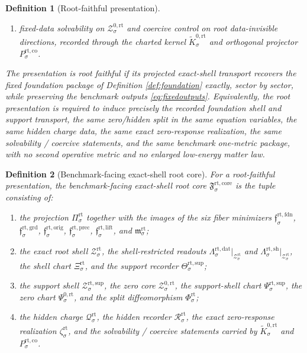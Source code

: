 \documentclass[11pt]{article}
\newcommand{\ForSpace}[1]{\mathcal I_{#1}^{\mathrm{for}}}
\newcommand{\RootProj}[1]{\Pi_{#1}^{\mathrm{rt}}}
\newcommand{\RootFoundMin}[1]{\mathfrak f_{#1}^{\mathrm{rt,fdn}}}
\newcommand{\RootGroundMin}[1]{\mathfrak f_{#1}^{\mathrm{rt,grd}}}
\newcommand{\RootOrigMin}[1]{\mathfrak f_{#1}^{\mathrm{rt,orig}}}
\newcommand{\RootPrecMin}[1]{\mathfrak f_{#1}^{\mathrm{rt,prec}}}
\newcommand{\RootLiftMin}[1]{\mathfrak f_{#1}^{\mathrm{rt,lift}}}
\newcommand{\RootSubMin}[1]{\mathfrak m_{#1}^{\mathrm{rt}}}
\newcommand{\RootData}[1]{\Lambda_{#1}^{\mathrm{rt,dat}}}
\newcommand{\RootShellMap}[1]{\Lambda_{#1}^{\mathrm{rt,sh}}}
\newcommand{\RootShellSet}[1]{\mathcal Z_{#1}^{\mathrm{rt}}}
\newcommand{\RootChart}[1]{\Xi_{#1}^{\mathrm{rt}}}
\newcommand{\RootSupport}[1]{\Theta_{#1}^{\mathrm{rt,sup}}}
\newcommand{\RootSupportShell}[1]{\mathcal Z_{#1}^{\mathrm{rt,sup}}}
\newcommand{\RootZeroCore}[1]{\mathcal Z_{#1}^{0,\mathrm{rt}}}
\newcommand{\RootEqChart}[1]{\Psi_{#1}^{\mathrm{rt,sup}}}
\newcommand{\RootZeroChart}[1]{\Psi_{#1}^{0,\mathrm{rt}}}
\newcommand{\RootSplit}[1]{\Phi_{#1}^{\mathrm{rt}}}
\newcommand{\RootCharge}[1]{\mathcal Q_{#1}^{\mathrm{rt}}}
\newcommand{\RootResidual}[1]{\mathcal R_{#1}^{\mathrm{rt}}}
\newcommand{\RootEmbed}[1]{\zeta_{#1}^{\mathrm{rt}}}
\newcommand{\RootKernelCh}[1]{\widetilde K_{#1}^{0,\mathrm{rt}}}
\newcommand{\RootStateComp}[1]{P_{#1}^{\mathrm{rt,co}}}
\newcommand{\SeedHidden}[1]{\mathcal H_{#1}^{\mathrm{sup}}}
\newcommand{\EqnTarget}[1]{Q_{#1}^{\mathrm{eqn}}}
\newcommand{\RootCore}[1]{\mathfrak F_{#1}^{\mathrm{rt,core}}}
\newtheorem{definition}{Definition}
\begin{document}
\begin{definition}[Root-faithful presentation]
\begin{enumerate}
    \[
    \RootCharge{\sigma}:\SeedHidden{\sigma}\to\EqnTarget{\sigma},
    \]
    the hidden recorder
    \[
    \RootResidual{\sigma}\bigl(\RootSplit{\sigma}(z,\eta)\bigr)
    \equiv
    \RootCharge{\sigma}(\eta),
    \]
    and a smooth observer-compatible exact root zero-response realization
    \[
    \RootEmbed{\sigma}:\ForSpace{\sigma}\hookrightarrow\RootZeroCore{\sigma};
    \]
    \item fixed-data solvability on \(\RootZeroCore{\sigma}\) and coercive control on root data-invisible directions, recorded through the charted kernel \(\RootKernelCh{\sigma}\) and orthogonal projector \(\RootStateComp{\sigma}\).
\end{enumerate}
The presentation is \emph{root faithful} if its projected exact-shell transport recovers the fixed foundation package of Definition \ref{def:foundation} exactly, sector by sector, while preserving the benchmark outputs \eqref{eq:fixedoutputs}. Equivalently, the root presentation is required to induce precisely the recorded foundation shell and support transport, the same zero/hidden split in the same equation variables, the same hidden charge data, the same exact zero-response realization, the same solvability / coercive statements, and the same benchmark one-metric package, with no second operative metric and no enlarged low-energy matter law.
\end{definition}

\begin{definition}[Benchmark-facing exact-shell root core]
\label{def:core}
For a root-faithful presentation, the \emph{benchmark-facing exact-shell root core} \(\RootCore{\sigma}\) is the tuple consisting of:
\begin{enumerate}
    \item the projection \(\RootProj{\sigma}\) together with the images of the six fiber minimizers \(\RootFoundMin{\sigma}\), \(\RootGroundMin{\sigma}\), \(\RootOrigMin{\sigma}\), \(\RootPrecMin{\sigma}\), \(\RootLiftMin{\sigma}\), and \(\RootSubMin{\sigma}\);
    \item the exact root shell \(\RootShellSet{\sigma}\), the shell-restricted readouts \(\RootData{\sigma}\big|_{\RootShellSet{\sigma}}\) and \(\RootShellMap{\sigma}\big|_{\RootShellSet{\sigma}}\), the shell chart \(\RootChart{\sigma}\), and the support recorder \(\RootSupport{\sigma}\);
    \item the support shell \(\RootSupportShell{\sigma}\), the zero core \(\RootZeroCore{\sigma}\), the support-shell chart \(\RootEqChart{\sigma}\), the zero chart \(\RootZeroChart{\sigma}\), and the split diffeomorphism \(\RootSplit{\sigma}\);
    \item the hidden charge \(\RootCharge{\sigma}\), the hidden recorder \(\RootResidual{\sigma}\), the exact zero-response realization \(\RootEmbed{\sigma}\), and the solvability / coercive statements carried by \(\RootKernelCh{\sigma}\) and \(\RootStateComp{\sigma}\).
\end{enumerate}
\end{definition}
\end{document}
